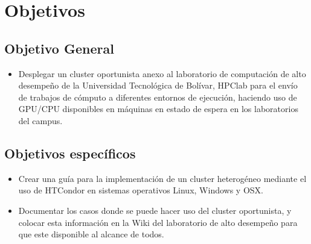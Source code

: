 
\section{Objetivos}
\subsection{Objetivo General}
\begin{itemize}
    \item Desplegar un cluster oportunista anexo al laboratorio de computación de alto desempeño de la Universidad Tecnológica de Bolívar, HPClab para el envío de trabajos de cómputo a diferentes entornos de ejecución, haciendo uso de GPU/CPU disponibles en máquinas en estado de espera en los laboratorios del campus.
\end{itemize}

\subsection{Objetivos específicos}
\begin{itemize}
    \item Crear una guía para la implementación de un cluster heterogéneo mediante el uso de HTCondor en sistemas operativos Linux, Windows y OSX. \autocite{HTCondor}
    \item Documentar los casos donde se puede hacer uso del cluster oportunista, y colocar esta información en la Wiki del laboratorio de alto desempeño para que este disponible al alcance de todos.
\end{itemize}








